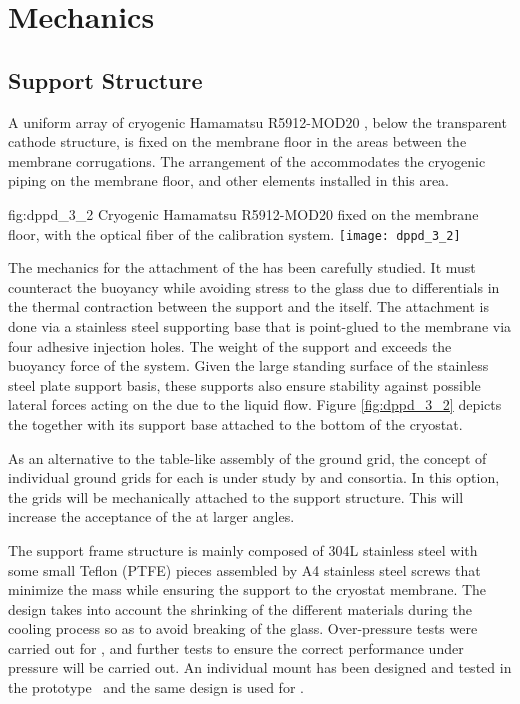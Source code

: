 \section{Mechanics}
\label{sec:dp-pds-mechanics}

\subsection{ Support Structure}
\label{subsec:dp-pds-mechanics-pmtsupport}

A uniform array of \dpnumpmtch cryogenic Hamamatsu R5912-MOD20 , below the transparent cathode structure, is fixed on the membrane floor in the areas between the membrane corrugations. The arrangement of the  accommodates the cryogenic piping on the membrane floor, and other elements installed in this area.

\begin{dunefigure}{fig:dppd_3_2}
{Cryogenic Hamamatsu R5912-MOD20  fixed on the membrane floor, with the optical fiber of the calibration system.}
\texttt{[image: dppd\_3\_2]}
\end{dunefigure}

The mechanics for the attachment of the  has been carefully studied. It must counteract the  buoyancy while avoiding stress to the  glass due to differentials in the thermal contraction between the support and the  itself. The attachment is done via a stainless steel supporting base that is point-glued to the membrane via four adhesive injection holes. The weight of the support and  exceeds the buoyancy force of the system. Given the large standing surface of the stainless steel plate support basis, these supports also ensure stability against possible lateral forces acting on the  due to the liquid flow. Figure \ref{fig:dppd_3_2} depicts the  together with its support base attached to the bottom of the cryostat.

As an alternative to the table-like assembly of the ground grid, the concept of individual ground grids for each  is under study by  and \dual {} consortia. In this option, the grids will be mechanically attached to the support structure. This will increase the acceptance of the  at larger angles.

The support frame structure is mainly composed of \num{304}L stainless steel with some small Teflon (PTFE) pieces assembled by A4 stainless steel screws that minimize the mass while ensuring the  support to the cryostat membrane. The design %
takes into account the shrinking of the different materials during the cooling process so as to avoid breaking of the  glass.
Over-pressure tests were carried out for , and further tests to ensure the correct performance under pressure will be carried out. An individual  mount has been designed and tested in the   prototype~\cite{Zambelli:2017dkg} and the same design is used for .

